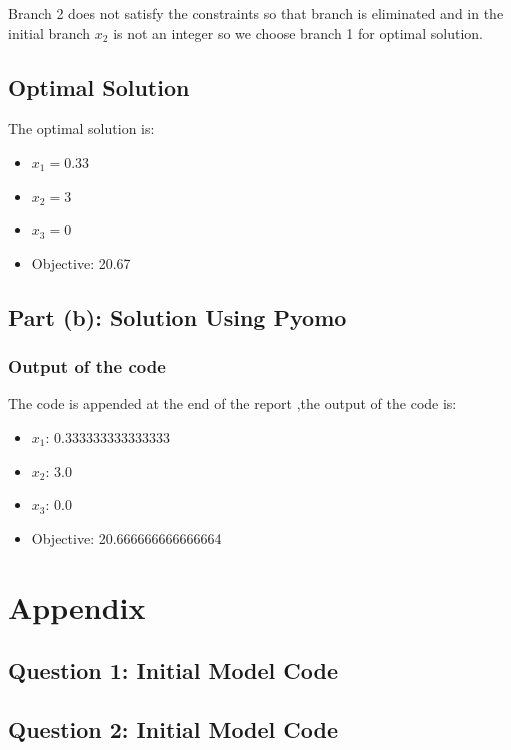 \documentclass[12pt]{article}
\begin{document}
Branch 2 does not satisfy the constraints so that branch is eliminated and in the initial branch $x_2$ is not an integer so we choose branch 1 for optimal solution.

\subsection*{Optimal Solution}

The optimal solution is:

\begin{itemize}
    \item \(x_1 = 0.33\)
    \item \(x_2 = 3\)
    \item \(x_3 = 0\)
    \item Objective: 20.67
\end{itemize}

\subsection*{Part (b): Solution Using Pyomo}

\subsubsection*{Output of the code}

The code is appended at the end of the report ,the output of the code is:

\begin{itemize}
    \item \(x_1\): 0.333333333333333
    \item \(x_2\): 3.0
    \item \(x_3\): 0.0
    \item Objective: 20.666666666666664
\end{itemize}

\newpage
\appendix
\section*{Appendix}

\subsection{Question 1: Initial Model Code}



\newpage

\subsection{Question 2: Initial Model Code}

\end{document}
